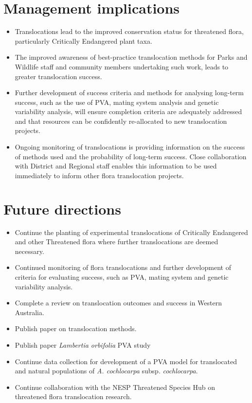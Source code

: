\documentclass[version=last,
    paper=a4, %
    10pt, %
    usenames,
    dvipsnames,
    oneside, %
    headings=openany, %
    DIV=15 %
]{scrbook}
\begin{document}
\section*{Management implications}
\begin{itemize}
\itemsep1pt\parskip0pt
\item
  Translocations lead to the improved conservation status for threatened
  flora, particularly Critically Endangered plant taxa.
\item
  The improved awareness of best-practice translocation methods for
  Parks and Wildlife staff and community members undertaking such work,
  leads to greater translocation success.
\item
  Further development of success criteria and methods for analysing
  long-term success, such as the use of PVA, mating system analysis and
  genetic variability analysis, will ensure completion criteria are
  adequately addressed and that resources can be confidently
  re-allocated to new translocation projects.
\item
  Ongoing monitoring of translocations is providing information on the
  success of methods used and the probability of long-term success.
  Close collaboration with District and Regional staff enables this
  information to be used immediately to inform other flora translocation
  projects.
\end{itemize}



\section*{Future directions}
\begin{itemize}
\itemsep1pt\parskip0pt
\item
  Continue the planting of experimental translocations of Critically
  Endangered and other Threatened flora where further translocations are
  deemed necessary.
\item
  Continued monitoring of flora translocations and further development
  of criteria for evaluating success, such as PVA, mating system and
  genetic variability analysis.
\item
  Complete a review on translocation outcomes and success in Western
  Australia.
\item
  Publish paper on translocation methods.
\item
  Publish paper \emph{Lambertia orbifolia} PVA study
\item
  Continue data collection for development of a PVA model for
  translocated and natural populations of \emph{A. cochlocarpa} subsp.
  \emph{cochlocarpa}.
\item
  Continue collaboration with the NESP Threatened Species Hub on
  threatened flora translocation research.
\end{itemize}



\end{document}
